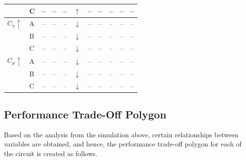 \documentclass[11pt, a4paper]{article}
\begin{document}
{\begin{longtable}{llccccccccc}
    & C & -- & -- & -- & $\uparrow$ & -- & -- & -- & -- & -- \\
    \midrule
    $C_\pi \uparrow$
    & A & -- & -- & -- & $\downarrow$ & -- & -- & -- & -- & -- \\
    & B & -- & -- & -- & $\downarrow$ & -- & -- & -- & -- & -- \\
    & C & -- & -- & -- & $\downarrow$ & -- & -- & -- & -- & -- \\
    \midrule
    $C_\mu \uparrow$
    & A & -- & -- & -- & $\downarrow$ & -- & -- & -- & -- & -- \\
    & B & -- & -- & -- & $\downarrow$ & -- & -- & -- & -- & -- \\
    & C & -- & -- & -- & $\downarrow$ & -- & -- & -- & -- & -- \\
\end{longtable}
}

\subsection*{Performance Trade-Off Polygon}
Based on the analysis from the simulation above, certain relationships between variables are obtained, and hence, the performance trade-off polygon for each of the circuit is created as follows.
\end{document}
